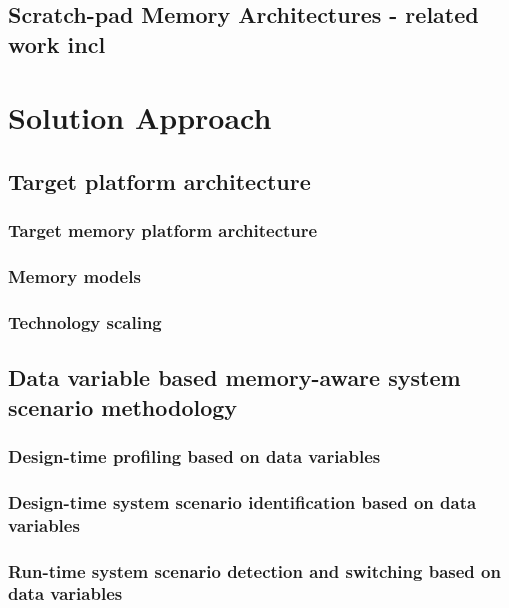 \section{Scratch-pad Memory Architectures - related work incl}


\chapter{Solution Approach}
\label{method}

\section{Target platform architecture}

\subsection{Target memory platform architecture}

\subsection{Memory models}

\subsection{Technology scaling}

\section{Data variable based memory-aware system scenario methodology}

\subsection{Design-time profiling based on data variables}

\subsection{Design-time system scenario identification based on data variables}

\subsection{Run-time system scenario detection and switching based on data variables}

